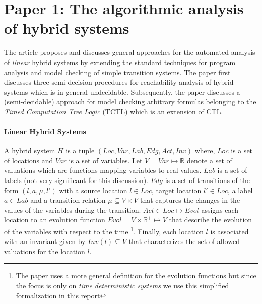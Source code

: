 \newcommand{\real}{\mathbb{R}}
\newcommand{\loc}{\mathit{Loc}}
\newcommand{\var}{\mathit{Var}}
\newcommand{\lab}{\mathit{Lab}}
\newcommand{\edg}{\mathit{Edg}}
\newcommand{\act}{\mathit{Act}}
\newcommand{\evol}{\mathit{Evol}}
\newcommand{\invr}{\mathit{Inv}}
\newcommand{\trans}{\mathit{(l,a,\mu,l')}}

\section{Paper 1: The algorithmic analysis of hybrid systems \cite{Alur:95}} \label{sec:paper1}

The article proposes and discusses general approaches for the automated analysis of \emph{linear} hybrid systems by extending the standard techniques for program analysis and model checking of simple transition systems. The paper first discusses three semi-decision procedures for reachability analysis of hybrid systems which is in general undecidable. Subsequently, the paper discusses a (semi-decidable) approach  for model checking arbitrary formulas belonging to the \emph{Timed Computation Tree Logic} (TCTL) which is an extension of CTL.

\paragraph*{\textbf{Linear Hybrid Systems}} 

A hybrid system $H$ is a tuple $(\loc,\var,\lab,\edg,\act,\invr)$ where,
$\loc$ is a set of locations and $\var$ is a set of variables. 
Let $V= \var \mapsto \real$ denote a set of valuations which are functions mapping variables to real values.
$\lab$ is a set of labels (not very significant for this discussion). $\edg$ is a set of transitions of the form $\trans$ with a source location $l \in \loc$, target location $l' \in \loc$, a label $a \in \lab$ and a transition relation $\mu \subseteq V \times V$ that captures the changes in the values of the variables during the transition. 
$\act \in \loc \mapsto \evol$ assigns each location to an evolution function $\evol = V \times \real^+ \mapsto V$ that describe the evolution of the variables with respect to the time 
\footnote{The paper uses a more general definition for the evolution functions but since the focus is only on \emph{time deterministic systems} we use this simplified formalization in this report}. 
Finally, each location $l$ is associated with an invariant given by $\invr(l) \subseteq V$ that characterizes the set of allowed valuations for the location $l$.

